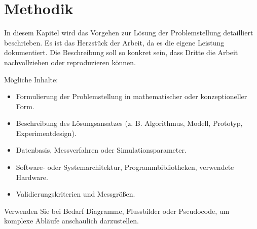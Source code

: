 \chapter{Methodik}\label{ch:methodik}

In diesem Kapitel wird das Vorgehen zur Lösung der Problemstellung detailliert beschrieben.
Es ist das Herzstück der Arbeit, da es die eigene Leistung dokumentiert.
Die Beschreibung soll so konkret sein, dass Dritte die Arbeit nachvollziehen oder reproduzieren können.

Mögliche Inhalte:
\begin{itemize}
\item Formulierung der Problemstellung in mathematischer oder konzeptioneller Form.
\item Beschreibung des Lösungsansatzes (z. B. Algorithmus, Modell, Prototyp, Experimentdesign).
\item Datenbasis, Messverfahren oder Simulationsparameter.
\item Software- oder Systemarchitektur, Programmbibliotheken, verwendete Hardware.
\item Validierungskriterien und Messgrößen.
\end{itemize}

Verwenden Sie bei Bedarf Diagramme, Flussbilder oder Pseudocode, um komplexe Abläufe anschaulich darzustellen.




